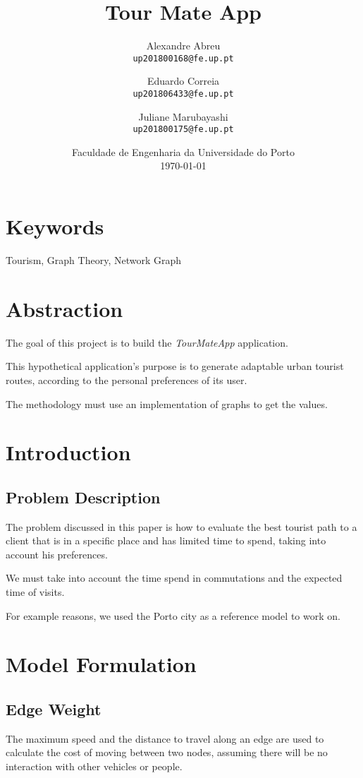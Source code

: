 \documentclass{article}
\title{\textbf{Tour Mate App}}
\author{
    Alexandre Abreu\\
    \texttt{up201800168@fe.up.pt}
    \and
    Eduardo Correia\\
    \texttt{up201806433@fe.up.pt}
    \and
    Juliane Marubayashi\\
    \texttt{up201800175@fe.up.pt}
}
\date{
    Faculdade de Engenharia da Universidade do Porto\\
    \today
}
\begin{document}
\maketitle

\section*{Keywords}

Tourism, Graph Theory, Network Graph

\section*{Abstraction}
    The goal of this project is to build the \textit{TourMateApp} application. \par
    This hypothetical application's purpose is to generate adaptable urban tourist routes, according to the personal preferences of its user.\par
    The methodology must use an implementation of graphs to get the values.

\section*{Introduction}
\subsection*{Problem Description}
    The problem discussed in this paper is how to evaluate the best tourist path to a client that is in a specific place and has limited time to spend, taking into account his preferences.\par
    We must take into account the time spend in commutations and the expected time of visits. \par
    For example reasons, we used the Porto city as a reference model to work on.

\section*{Model Formulation}
\subsection*{Edge Weight}
    The maximum speed and the distance to travel along an edge are used to calculate the cost of moving between two nodes, assuming there will be no interaction with other vehicles or people. \par
\end{document}
